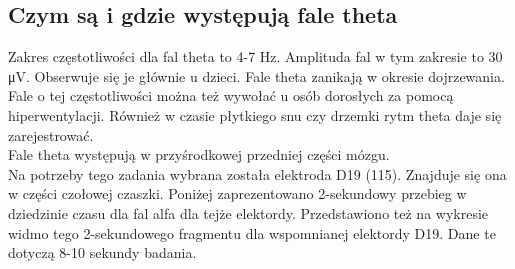 \documentclass{article}
\begin{document}
    \subsection{Czym są i gdzie występują fale theta}

    Zakres częstotliwości dla fal theta to 4-7 Hz. Amplituda fal w tym zakresie to 30 \si{\micro\volt}. Obserwuje się je głównie u dzieci. Fale theta zanikają w okresie dojrzewania. Fale o tej częstotliwości można też wywołać u osób dorosłych za pomocą hiperwentylacji. Również w czasie płytkiego snu czy drzemki rytm theta daje się zarejestrować.\\

    Fale theta występują w przyśrodkowej przedniej części mózgu.\\

    Na potrzeby tego zadania wybrana została elektroda D19 (115). Znajduje się ona w części czołowej czaszki. Poniżej zaprezentowano 2-sekundowy przebieg w dziedzinie czasu dla fal alfa dla tejże elektordy. Przedstawiono też na wykresie widmo tego 2-sekundowego fragmentu dla wspomnianej elektordy D19. Dane te dotyczą 8-10 sekundy badania.

    \newpage
\end{document}
